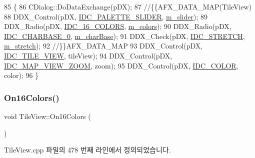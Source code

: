 \begin{DoxyCode}
85 \{
86   CDialog::DoDataExchange(pDX);
87   \textcolor{comment}{//\{\{AFX\_DATA\_MAP(TileView)}
88   DDX\_Control(pDX, \mbox{\hyperlink{resource_8h_ae398a4a3d20d01692ce6aa2e9ad41c76}{IDC\_PALETTE\_SLIDER}}, \mbox{\hyperlink{class_tile_view_a3423f8bf0fe4b1bd0273d9ffbd3fb390}{m\_slider}});
89   DDX\_Radio(pDX, \mbox{\hyperlink{resource_8h_a78f8c25f0c6dba01f76023a9a6151322}{IDC\_16\_COLORS}}, \mbox{\hyperlink{class_tile_view_ad61048a17d2a93f3b8cb413d17a1533a}{m\_colors}});
90   DDX\_Radio(pDX, \mbox{\hyperlink{resource_8h_ae2dd08d4db99bfdb3e6aa9513a5e0790}{IDC\_CHARBASE\_0}}, \mbox{\hyperlink{class_tile_view_a1fd549925ae533d9ce7215b8d5de4c63}{m\_charBase}});
91   DDX\_Check(pDX, \mbox{\hyperlink{resource_8h_a639d2318d8892c6f42b323500aae50f0}{IDC\_STRETCH}}, \mbox{\hyperlink{class_tile_view_a21a8f1dc56ad2e1107719d64fb206d2e}{m\_stretch}});
92   \textcolor{comment}{//\}\}AFX\_DATA\_MAP}
93   DDX\_Control(pDX, \mbox{\hyperlink{resource_8h_a091df1e8af92b702472240d05fafd9cc}{IDC\_TILE\_VIEW}}, tileView);
94   DDX\_Control(pDX, \mbox{\hyperlink{resource_8h_a623597a58dcab206815a2c2fc7de0d91}{IDC\_MAP\_VIEW\_ZOOM}}, zoom);
95   DDX\_Control(pDX, \mbox{\hyperlink{resource_8h_a611975b03b6d7ce68b2de260b97086d0}{IDC\_COLOR}}, color);
96 \}
\end{DoxyCode}
\mbox{\label{class_tile_view_a482139c5bc655015ba0700db5c04ec91}} 
\subsubsection{\texorpdfstring{On16\+Colors()}{On16Colors()}}
{\footnotesize\ttfamily void Tile\+View\+::\+On16\+Colors (\begin{DoxyParamCaption}{ }\end{DoxyParamCaption})\hspace{0.3cm}{\ttfamily [protected]}}



Tile\+View.\+cpp 파일의 478 번째 라인에서 정의되었습니다.



